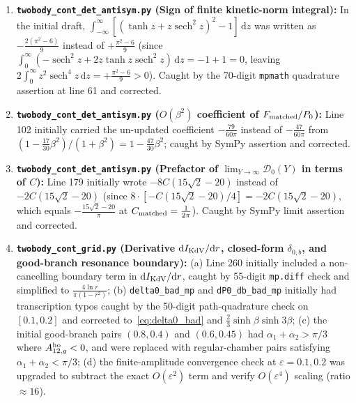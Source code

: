 \documentclass[11pt,a4paper]{article}
\newcommand{\script}[1]{\texttt{#1}}
\newcommand{\dd}{\mathrm{d}}
\begin{document}
\begin{enumerate}
\item \textbf{\script{twobody\_cont\_det\_antisym.py} (Sign of finite kinetic-norm integral):} In the initial draft, $\int_{-\infty}^\infty[(\tanh z+z\operatorname{sech}^2 z)^2-1]\,\dd z$ was written as $-\frac{2(\pi^2-6)}{9}$ instead of $+\frac{\pi^2-6}{9}$ (since $\int_0^\infty(-\operatorname{sech}^2 z+2z\tanh z\operatorname{sech}^2 z)\,\dd z=-1+1=0$, leaving $2\int_0^\infty z^2\operatorname{sech}^4 z\,\dd z=+\frac{\pi^2-6}{9}>0$). Caught by the 70-digit \texttt{mpmath} quadrature assertion at line 61 and corrected.
\item \textbf{\script{twobody\_cont\_det\_antisym.py} ($O(\beta^2)$ coefficient of $F_{\rm matched}/P_0$):} Line 102 initially carried the un-updated coefficient $-\frac{79}{60\pi}$ instead of $-\frac{47}{60\pi}$ from $(1-\frac{17}{30}\beta^2)/(1+\beta^2)=1-\frac{47}{30}\beta^2$; caught by SymPy assertion and corrected.
\item \textbf{\script{twobody\_cont\_det\_antisym.py} (Prefactor of $\lim_{Y\to\infty}\mathcal{D}_0(Y)$ in terms of $C$):} Line 179 initially wrote $-8C(15\sqrt2-20)$ instead of $-2C(15\sqrt2-20)$ (since $8\cdot[-C(15\sqrt2-20)/4]=-2C(15\sqrt2-20)$, which equals $-\frac{15\sqrt2-20}{\pi}$ at $C_{\rm matched}=\frac{1}{2\pi}$). Caught by SymPy limit assertion and corrected.
\item \textbf{\script{twobody\_cont\_grid.py} (Derivative $\dd I_{\rm KdV}/\dd r$, closed-form $\delta_{0,b}$, and good-branch resonance boundary):} (a) Line 260 initially included a non-cancelling boundary term in $\dd I_{\rm KdV}/\dd r$, caught by 55-digit \texttt{mp.diff} check and simplified to $\frac{4\ln r}{\pi(1-r^2)}$; (b) \texttt{delta0\_bad\_mp} and \texttt{dP0\_db\_bad\_mp} initially had transcription typos caught by the 50-digit path-quadrature check on $[0.1,0.2]$ and corrected to~\eqref{eq:delta0_bad} and $\frac23\sinh\beta\sinh 3\beta$; (c) the initial good-branch pairs $(0.8,0.4)$ and $(0.6,0.45)$ had $\alpha_1+\alpha_2>\pi/3$ where $A_{12,g}^{\rm ho}<0$, and were replaced with regular-chamber pairs satisfying $\alpha_1+\alpha_2<\pi/3$; (d) the finite-amplitude convergence check at $\varepsilon=0.1,0.2$ was upgraded to subtract the exact $O(\varepsilon^2)$ term and verify $O(\varepsilon^4)$ scaling (ratio $\approx 16$).
\end{enumerate}
\end{document}

